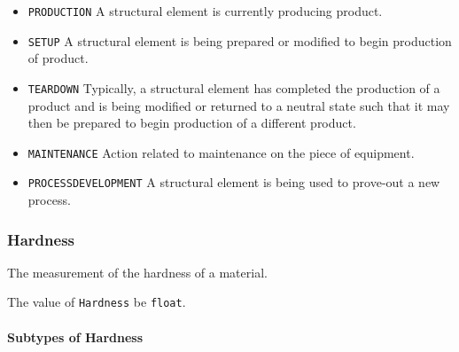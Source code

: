 \begin{itemize}
\item \texttt{PRODUCTION} \newline A \gls{structural element} is currently producing product. 
\item \texttt{SETUP} \newline A \gls{structural element} is being prepared or modified to begin production of product. 
\item \texttt{TEARDOWN} \newline Typically, a \gls{structural element} has completed the production of a product and is being modified or returned to a neutral state such that it may then be prepared to begin production of a different product. 
\item \texttt{MAINTENANCE} \newline Action related to maintenance on the piece of equipment. 
\item \texttt{PROCESS\textunderscore DEVELOPMENT} \newline A \gls{structural element} is being used to prove-out a new process. 
\end{itemize}



\subsubsection{Hardness}
\label{sec:Hardness}



The measurement of the hardness of a material.


The value of \texttt{Hardness} \MUST be \texttt{float}.


\paragraph{Subtypes of Hardness}\mbox{}
\label{sec:Subtypes of Hardness}

